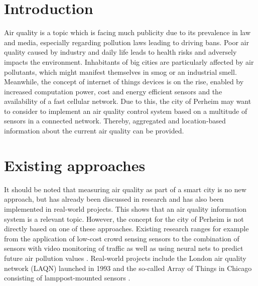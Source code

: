 \documentclass[conference]{IEEEtran}
\begin{document}
\begin{abstract}
\end{abstract}





%
\IEEEpeerreviewmaketitle

\section{Introduction}

Air quality is a topic which is facing much publicity due to its prevalence in law and media, especially regarding pollution laws leading to driving bans. Poor air quality caused by industry and daily life leads to health risks and adversely impacts the environment. Inhabitants of big cities are particularly affected by air pollutants, which might manifest themselves in smog or an industrial smell.
Meanwhile, the concept of internet of things devices is on the rise, enabled by increased computation power, cost and energy efficient sensors and the availability of a fast cellular network.
\newline
Due to this, the city of Perheim may want to consider to implement an air quality control system based on a multitude of sensors in a connected network. Thereby, aggregated and location-based information about the current air quality can be provided.

\section{Existing approaches}
It should be noted that measuring air quality as part of a smart city is no new approach, but has already been discussed in research \cite{Nagaraj} and has also been implemented in real-world projects. This shows that an air quality information system is a relevant topic. However, the concept for the city of Perheim is not directly based on one of these approaches. Existing research ranges for example from the application of low-cost crowd sensing sensors \cite{Dutta} to the combination of sensors with video monitoring of traffic \cite{Mehta} as well as using neural nets to predict future air pollution values \cite{Kok}. Real-world projects include the London air quality network (LAQN) launched in 1993 \cite{Mittal.2018} and the so-called Array of Things in Chicago consisting of lamppost-mounted sensors \cite{Adler.2015}.
\end{document}
